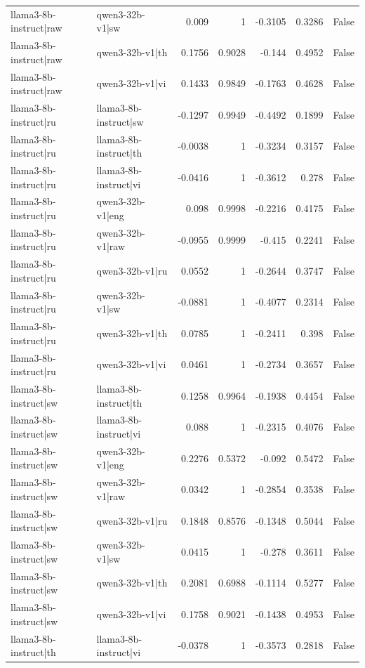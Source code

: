 \begin{table}
\begin{tabular}{l l r r r r l}
llama3-8b-instruct|raw & qwen3-32b-v1|sw & 0.009 & 1 & -0.3105 & 0.3286 & False \\
llama3-8b-instruct|raw & qwen3-32b-v1|th & 0.1756 & 0.9028 & -0.144 & 0.4952 & False \\
llama3-8b-instruct|raw & qwen3-32b-v1|vi & 0.1433 & 0.9849 & -0.1763 & 0.4628 & False \\
llama3-8b-instruct|ru & llama3-8b-instruct|sw & -0.1297 & 0.9949 & -0.4492 & 0.1899 & False \\
llama3-8b-instruct|ru & llama3-8b-instruct|th & -0.0038 & 1 & -0.3234 & 0.3157 & False \\
llama3-8b-instruct|ru & llama3-8b-instruct|vi & -0.0416 & 1 & -0.3612 & 0.278 & False \\
llama3-8b-instruct|ru & qwen3-32b-v1|eng & 0.098 & 0.9998 & -0.2216 & 0.4175 & False \\
llama3-8b-instruct|ru & qwen3-32b-v1|raw & -0.0955 & 0.9999 & -0.415 & 0.2241 & False \\
llama3-8b-instruct|ru & qwen3-32b-v1|ru & 0.0552 & 1 & -0.2644 & 0.3747 & False \\
llama3-8b-instruct|ru & qwen3-32b-v1|sw & -0.0881 & 1 & -0.4077 & 0.2314 & False \\
llama3-8b-instruct|ru & qwen3-32b-v1|th & 0.0785 & 1 & -0.2411 & 0.398 & False \\
llama3-8b-instruct|ru & qwen3-32b-v1|vi & 0.0461 & 1 & -0.2734 & 0.3657 & False \\
llama3-8b-instruct|sw & llama3-8b-instruct|th & 0.1258 & 0.9964 & -0.1938 & 0.4454 & False \\
llama3-8b-instruct|sw & llama3-8b-instruct|vi & 0.088 & 1 & -0.2315 & 0.4076 & False \\
llama3-8b-instruct|sw & qwen3-32b-v1|eng & 0.2276 & 0.5372 & -0.092 & 0.5472 & False \\
llama3-8b-instruct|sw & qwen3-32b-v1|raw & 0.0342 & 1 & -0.2854 & 0.3538 & False \\
llama3-8b-instruct|sw & qwen3-32b-v1|ru & 0.1848 & 0.8576 & -0.1348 & 0.5044 & False \\
llama3-8b-instruct|sw & qwen3-32b-v1|sw & 0.0415 & 1 & -0.278 & 0.3611 & False \\
llama3-8b-instruct|sw & qwen3-32b-v1|th & 0.2081 & 0.6988 & -0.1114 & 0.5277 & False \\
llama3-8b-instruct|sw & qwen3-32b-v1|vi & 0.1758 & 0.9021 & -0.1438 & 0.4953 & False \\
llama3-8b-instruct|th & llama3-8b-instruct|vi & -0.0378 & 1 & -0.3573 & 0.2818 & False \\

\end{tabular}
\end{table}
